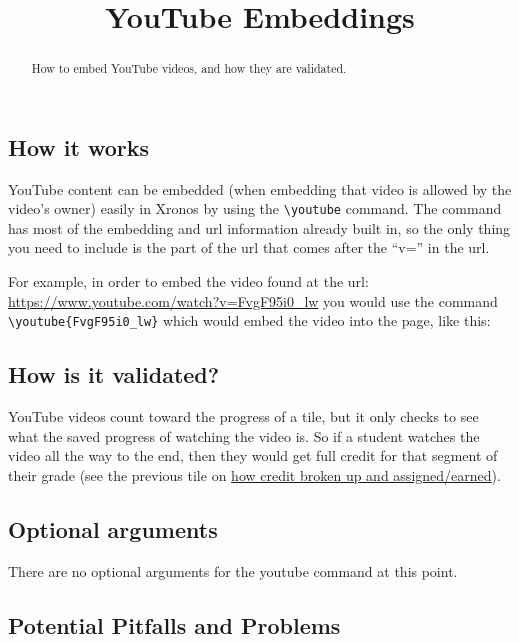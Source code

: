 \documentclass{ximera}
\title{YouTube Embeddings}
\begin{document}
\begin{abstract}
    How to embed YouTube videos, and how they are validated.
\end{abstract}
\maketitle


\subsection*{How it works}
    YouTube content can be embedded (when embedding that video is allowed by the video's owner) easily in Xronos by using the \verb|\youtube| command. The command has most of the embedding and url information already built in, so the only thing you need to include is the part of the url that comes after the ``v='' in the url.
    
    For example, in order to embed the video found at the url: \url{https://www.youtube.com/watch?v=FvgF95i0_lw} you would use the command \verb|\youtube{FvgF95i0_lw}| which would embed the video into the page, like this:
    


\subsection*{How is it validated?}
    YouTube videos count toward the progress of a tile, but it only checks to see what the saved progress of watching the video is. So if a student watches the video all the way to the end, then they would get full credit for that segment of their grade (see the previous tile on \href{https://xronos.clas.ufl.edu/examples/exampleCore/assignments/creditAllocation}{how credit broken up and assigned/earned}). 
    
    
\subsection*{Optional arguments}
    There are no optional arguments for the youtube command at this point. 

\subsection*{Potential Pitfalls and Problems}
\end{document}
